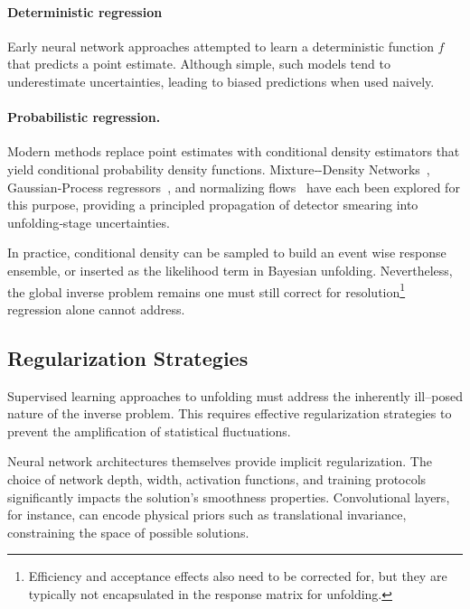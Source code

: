             \paragraph{Deterministic regression}
                Early neural network approaches attempted to learn a deterministic function $f$ that predicts a point estimate.
                Although simple, such models tend to underestimate uncertainties, leading to biased predictions when used naively.
            \paragraph{Probabilistic regression.}
                Modern methods replace point estimates with conditional density estimators that yield conditional probability density functions.
                Mixture‐-Density Networks~\cite{burton_mixture_2021, chen_physics-guided_2022, kuleshov_calibrated_2025, prassa_bayesian_2025, peng_efficient_2025}, Gaussian‐Process
                regressors~\cite{iwata_meta-learning_2023}, and normalizing flows~\cite{du_unifying_2024, bellagente_go_2022}
                have each been explored for this purpose, providing a principled propagation
                of detector smearing into unfolding‐stage uncertainties.

            In practice, conditional density can be sampled to build an event wise response ensemble, or inserted as the likelihood term in Bayesian unfolding.
            Nevertheless, the global inverse problem remains one must still correct for resolution\footnote{Efficiency and acceptance effects also need to be corrected for, but they are typically not encapsulated in the response matrix for unfolding.} regression alone cannot address.
    \subsection{Regularization Strategies}
        Supervised learning approaches to unfolding must address the inherently ill--posed nature of the inverse problem.
        This requires effective regularization strategies to prevent the amplification of statistical fluctuations.

        Neural network architectures themselves provide implicit regularization.
        The choice of network depth, width, activation functions, and training protocols significantly impacts the solution's smoothness properties.
        Convolutional layers, for instance, can encode physical priors such as translational invariance, constraining the space of possible solutions.

